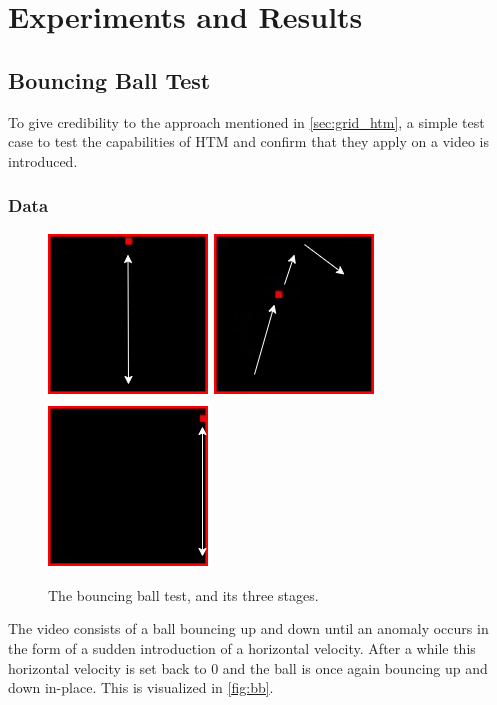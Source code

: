 \chapter{Experiments and Results}
\label{sec:experiments}
\section{Bouncing Ball Test}
To give credibility to the approach mentioned in \autoref{sec:grid_htm}, a simple test case to test the capabilities of HTM and confirm that they apply on a video is introduced.
\subsection{Data}
\begin{figure}[H]
    \centering
    \includegraphics[width=.3\textwidth]{resources/experiments/bouncing_ball/bb_updown1.png}\hfill
    \includegraphics[width=.3\textwidth]{resources/experiments/bouncing_ball/bb_updownside.png}\hfill
    \includegraphics[width=.3\textwidth]{resources/experiments/bouncing_ball/bb_updown2.png}
    \caption{The bouncing ball test, and its three stages.}
    \label{fig:bb}
\end{figure}
The video consists of a ball bouncing up and down until an anomaly occurs in the form of a sudden introduction of a horizontal velocity. After a while this horizontal velocity is set back to 0 and the ball is once again bouncing up and down in-place. This is visualized in \autoref{fig:bb}.
\par
